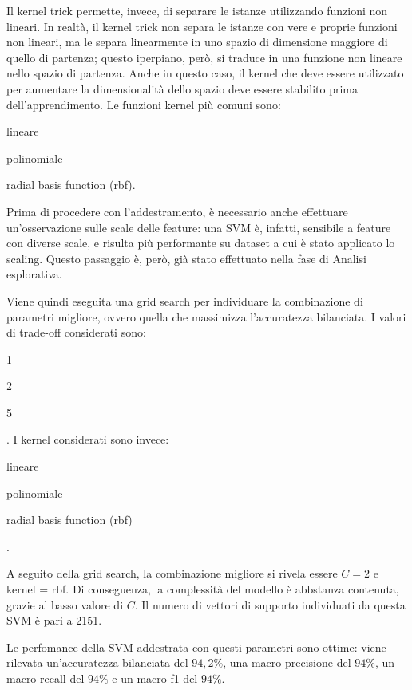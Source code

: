 Il kernel trick permette, invece, di separare le istanze utilizzando funzioni non
lineari. In realtà, il kernel trick non separa le istanze con vere e proprie
funzioni non lineari, ma le separa linearmente in uno spazio di dimensione
maggiore di quello di partenza; questo 
iperpiano, però, si traduce in una funzione non lineare nello spazio di partenza.
Anche in questo caso, il kernel che deve essere utilizzato per aumentare la
dimensionalità dello spazio deve essere stabilito prima dell'apprendimento.
Le funzioni kernel più comuni sono: \begin{itemize*}
    \item lineare
    \item polinomiale
    \item radial basis function (rbf).
\end{itemize*}

Prima di procedere con l'addestramento, è necessario anche effettuare un'osservazione
sulle scale delle feature: una SVM è, infatti, sensibile a feature con diverse scale,
e risulta più performante su dataset a cui è stato applicato lo scaling.
Questo passaggio è, però, già stato effettuato nella fase di Analisi esplorativa.

Viene quindi eseguita una grid search per individuare la combinazione di parametri
migliore, ovvero quella che massimizza l'accuratezza bilanciata.
I valori di trade-off considerati sono: \begin{itemize*}
    \item 1
    \item 2
    \item 5
\end{itemize*}.
I kernel considerati sono invece: \begin{itemize*}
    \item lineare
    \item polinomiale
    \item radial basis function (rbf)
\end{itemize*}.

A seguito della grid search, la combinazione migliore si rivela essere $C=2$ e
kernel = rbf. Di conseguenza, la complessità del modello è abbstanza contenuta,
grazie al basso valore di $C$.
Il numero di vettori di supporto individuati da questa SVM è pari a 2151.

Le perfomance della SVM addestrata con questi parametri sono ottime:
viene rilevata un'accuratezza bilanciata del $94,2\%$, una macro-precisione 
del $94\%$, un macro-recall del $94\%$ e un macro-f1 del $94\%$.

